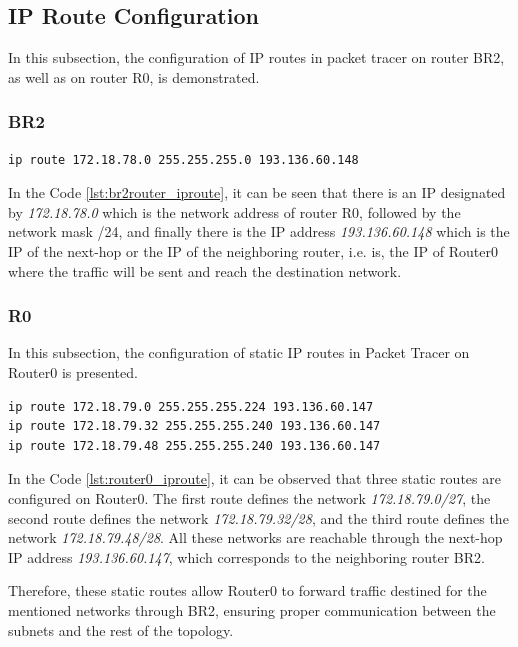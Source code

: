 \subsection{IP Route Configuration}

In this subsection, the configuration of IP routes in packet tracer on router BR2, as well as on router R0, is demonstrated. 
\vspace{0.1cm}
\subsubsection*{BR2}

\begin{lstlisting}[caption={IP Route Demonstration of BR2 Router}, label={lst:br2router_iproute}]
ip route 172.18.78.0 255.255.255.0 193.136.60.148
\end{lstlisting}

In the Code \ref{lst:br2router_iproute}, it can be seen that there is an IP designated by \textit{172.18.78.0} which is the network address of router R0, followed by the network mask /24, and finally there is the IP address \textit{193.136.60.148} which is the IP of the next-hop or the IP of the neighboring router, i.e. is, the IP of Router0 where the traffic will be sent and reach the destination network.

\vspace{0.1cm}
\subsubsection*{R0}
In this subsection, the configuration of static IP routes in Packet Tracer on Router0 is presented. 

\begin{lstlisting}[caption={IP Route Demonstration of Router0}, label={lst:router0_iproute}]
ip route 172.18.79.0 255.255.255.224 193.136.60.147
ip route 172.18.79.32 255.255.255.240 193.136.60.147
ip route 172.18.79.48 255.255.255.240 193.136.60.147
\end{lstlisting}

In the Code \ref{lst:router0_iproute}, it can be observed that three static routes are configured on Router0. The first route defines the network \textit{172.18.79.0/27}, the second route defines the network \textit{172.18.79.32/28}, and the third route defines the network \textit{172.18.79.48/28}. All these networks are reachable through the next-hop IP address \textit{193.136.60.147}, which corresponds to the neighboring router BR2. 

Therefore, these static routes allow Router0 to forward traffic destined for the mentioned networks through BR2, ensuring proper communication between the subnets and the rest of the topology.
